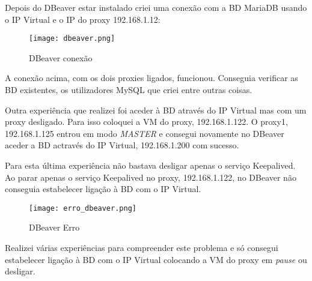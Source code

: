 Depois do DBeaver estar instalado criei uma conexão com a \ac{BD} MariaDB usando o \ac{IP} Virtual e o \ac{IP} do proxy 192.168.1.12:

\begin{figure}[H]
\center
\texttt{[image: dbeaver.png]}
\caption{DBeaver conexão}
\end{figure}

A conexão acima, com os dois proxies ligados, funcionou. Conseguia verificar as \ac{BD} existentes, os utilizadores MySQL que criei entre outras coisas.

\hfill \break
\indent Outra experiência que realizei foi aceder à \ac{BD} através do \ac{IP} Virtual mas com um proxy desligado. 
Para isso coloquei a \ac{VM} do proxy, 192.168.1.122. O proxy1, 192.168.1.125 entrou em modo \textit{MASTER} e consegui novamente no DBeaver aceder a \ac{BD} actravés do \ac{IP} Virtual, 192.168.1.200 com sucesso. 

Para esta última experiência não bastava desligar apenas o serviço Keepalived. Ao parar apenas o serviço Keepalived no proxy, 192.168.1.122, no DBeaver não conseguia estabelecer ligação à \ac{BD} com o \ac{IP} Virtual.

\begin{figure}[H]
\center
\texttt{[image: erro\_dbeaver.png]}
\caption{DBeaver Erro}
\end{figure}

Realizei várias experiências para compreender este problema e só consegui estabelecer ligação à \ac{BD} com o \ac{IP} Virtual colocando a \ac{VM} do proxy em \textit{pause} ou desligar.


